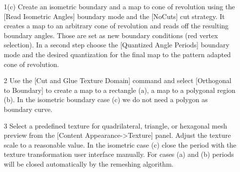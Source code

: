 \documentclass[Thesis.tex]{subfiles}
\begin{document}
\begin{itemize}
\item[1(c)] Create an isometric boundary and a map to cone of revolution using the [Read Isometric Angles] boundary mode and the [NoCuts] cut strategy. It creates a map to an arbitrary cone of revolution and reads off the resulting boundary angles. Those are set as new boundary conditions (red vertex selection). In a second step choose the [Quantized Angle Periods] boundary mode and the desired quantization for the final map to the pattern adapted cone of revolution.

\begin{center}
\begin{minipage}{0.9\linewidth}
            \centering
\end{minipage}
\end{center}    

\item[2] Use the [Cut and Glue Texture Domain] command and select [Orthogonal to Boundary] to create a map to a rectangle (a), a map to a polygonal region (b). In the isometric boundary case (c) we do not need a polygon as boundary curve.
\item[3] Select a predefined texture for quadrilateral, triangle, or hexagonal mesh preview from the [Content Appearance->Texture] panel. Adjust the texture scale to a reasonable value. In the isometric case (c) close the period with the texture transformation user interface manually. For cases (a) and (b) periods will be closed automatically by the remeshing algorithm.

\begin{center}
\begin{minipage}{0.9\linewidth}
            \centering
\end{minipage}
\end{center}    


\end{itemize}
\end{document}
